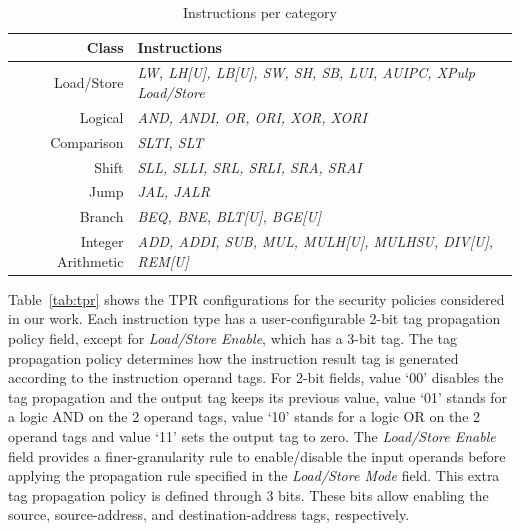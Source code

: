 \begin{table}[t]
    \centering
    \caption{Instructions per category}
    \label{tab:insnClasses}
    \begin{tabular}{@{}rl@{}}
        \toprule
        \textbf{Class} & \textbf{Instructions} \\ \midrule
        Load/Store & \textit{LW, LH{[}U{]}, LB{[}U{]}, SW, SH, SB, LUI, AUIPC, XPulp Load/Store} \\
        Logical & \textit{AND, ANDI, OR, ORI, XOR, XORI} \\
        Comparison & \textit{SLTI, SLT} \\
        Shift & \textit{SLL, SLLI, SRL, SRLI, SRA, SRAI} \\
        Jump & \textit{JAL, JALR} \\
        Branch & \textit{BEQ, BNE, BLT{[}U{]}, BGE{[}U{]}} \\
        Integer Arithmetic & \textit{ADD, ADDI, SUB, MUL, MULH{[}U{]}, MULHSU, DIV{[}U{]}, REM{[}U{]}} \\ \bottomrule
    \end{tabular}
\end{table}


Table~\ref{tab:tpr} shows the TPR configurations for the security policies considered in our work.
Each instruction type has a user-configurable 2-bit tag propagation policy field, except for \textit{Load/Store Enable}, which has a 3-bit tag. %
The tag propagation policy determines how the instruction result tag is generated according to the instruction operand tags.
For 2-bit fields, value `00' disables the tag propagation and the output tag keeps its previous value, value `01' stands for a logic AND on the 2 operand tags, value `10' stands for a logic OR on the 2 operand tags and value `11' sets the output tag to zero. 
The \textit{Load/Store Enable} field provides a finer-granularity rule to enable/disable the input operands before applying the propagation rule specified in the \textit{Load/Store Mode} field. This extra tag propagation policy is defined through 3 bits. These bits allow enabling the source, source-address, and destination-address tags, respectively.

